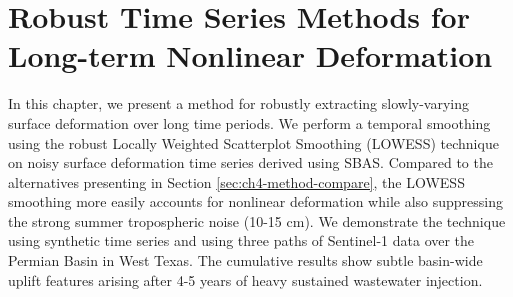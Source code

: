 %



\chapter{Robust Time Series Methods for Long-term Nonlinear Deformation}
\label{CHAP:5-robust-ts}


In this chapter, we present a method for robustly extracting slowly-varying surface deformation over long time periods.
We perform a temporal smoothing using the robust Locally Weighted Scatterplot Smoothing (LOWESS) technique \cite{Cleveland1979RobustLocallyWeighted} on noisy surface deformation time series derived using SBAS.
Compared to the alternatives presenting in Section \ref{sec:ch4-method-compare}, the LOWESS smoothing more easily accounts for nonlinear deformation while also suppressing the strong summer tropospheric noise (10-15 cm).
We demonstrate the technique using synthetic time series and using three paths of Sentinel-1 data over the Permian Basin in West Texas. 
The cumulative results show subtle basin-wide uplift features arising after 4-5 years of heavy sustained wastewater injection.



%	

